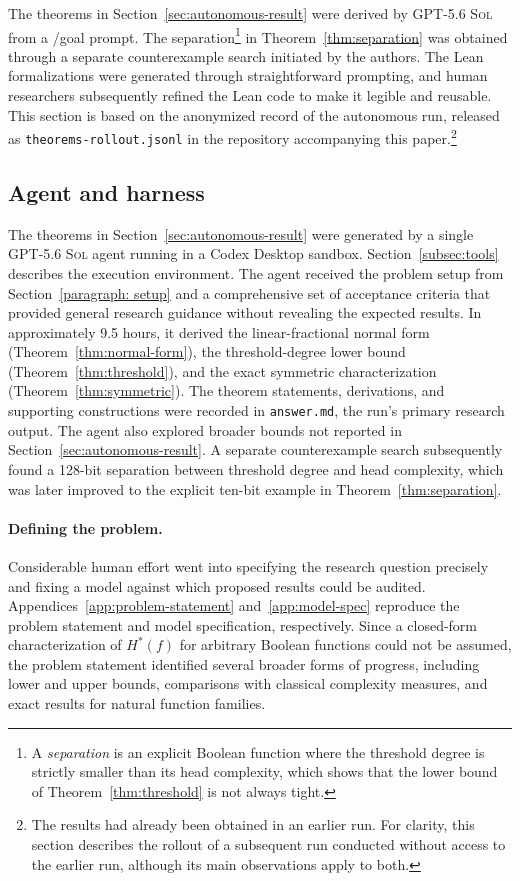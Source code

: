 \documentclass{article}
\theoremstyle{definition}
\theoremstyle{plain}
\newcommand{\hstar}{H^{\ast}}
\newcommand{\gpt}{\textsc{GPT-5.6 Sol}\xspace}
\begin{document}
The theorems in Section~\ref{sec:autonomous-result} were derived by \gpt{} from a /goal prompt. The separation\footnote{A \emph{separation} is an explicit Boolean function where the threshold degree is strictly smaller than its head complexity, which shows that the lower bound of Theorem~\ref{thm:threshold} is not always tight.} in Theorem~\ref{thm:separation} was obtained through a separate counterexample search initiated by the authors. The Lean formalizations were generated through straightforward prompting, and human researchers subsequently refined the Lean code to make it legible and reusable. This section is based on the anonymized record of the autonomous run, released as \texttt{theorems-rollout.jsonl} in the repository accompanying this paper.\footnote{The results had already been obtained in an earlier run. For clarity, this section describes the rollout of a subsequent run conducted without access to the earlier run, although its main observations apply to both.}

\subsection{Agent and harness}


The theorems in Section~\ref{sec:autonomous-result} were generated by a single \gpt agent running in a Codex Desktop sandbox. Section~\ref{subsec:tools} describes the execution environment. The agent received the problem setup from Section~\ref{paragraph: setup} and a comprehensive set of acceptance criteria that provided general research guidance without revealing the expected results. In approximately 9.5 hours, it derived the linear-fractional normal form (Theorem~\ref{thm:normal-form}), the threshold-degree lower bound (Theorem~\ref{thm:threshold}), and the exact symmetric characterization (Theorem~\ref{thm:symmetric}). The theorem statements, derivations, and supporting constructions were recorded in \texttt{answer.md}, the run's primary research output. The agent also explored broader bounds not reported in Section~\ref{sec:autonomous-result}. A separate counterexample search subsequently found a 128-bit separation between threshold degree and head complexity, which was later improved to the explicit ten-bit example in Theorem~\ref{thm:separation}.

\paragraph{Defining the problem.}
Considerable human effort went into specifying the research question precisely and fixing a model against which proposed results could be audited. Appendices~\ref{app:problem-statement} and~\ref{app:model-spec} reproduce the problem statement and model specification, respectively. Since a closed-form characterization of $\hstar(f)$ for arbitrary Boolean functions could not be assumed, the problem statement identified several broader forms of progress, including lower and upper bounds, comparisons with classical complexity measures, and exact results for natural function families.
\end{document}
